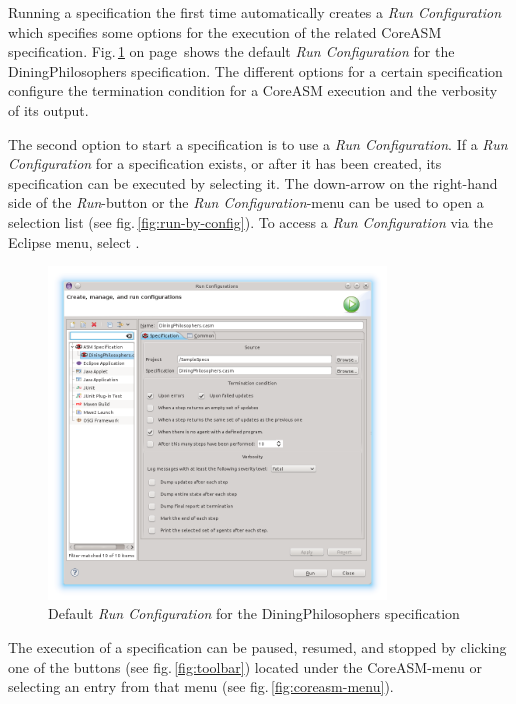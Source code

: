 \documentclass[10pt,oneside,a4paper]{article}
\begin{document}
Running a specification the first time automatically creates a \emph{Run Configuration} which specifies some options for the execution of the related CoreASM specification. Fig.\,\ref{fig:run-config} on page\,\pageref{fig:run-config} shows the default \emph{Run Configuration} for the DiningPhilosophers specification. The different options for a certain specification configure the termination condition for a CoreASM execution and the verbosity of its output.

The second option to start a specification is to use a \emph{Run Configuration}. If a \emph{Run Configuration} for a specification exists, or after it has been created, its specification can be executed by selecting it. The down-arrow on the right-hand side of the \emph{Run}-button or the \emph{Run Configuration}-menu can be used to open a selection list (see fig.\,\ref{fig:run-by-config}). To access a \emph{Run Configuration} via the Eclipse menu, select .

\begin{figure}[h]
	\centering
	\includegraphics[width=0.8\textwidth]{images/run-configuration.png}
	\caption{Default \emph{Run Configuration} for the DiningPhilosophers specification}
	\label{fig:run-config}
\end{figure}

The execution of a specification can be paused, resumed, and stopped by clicking one of the buttons (see fig.\,\ref{fig:toolbar}) located under the CoreASM-menu or selecting an entry from that menu (see fig.\,\ref{fig:coreasm-menu}).
\end{document}
